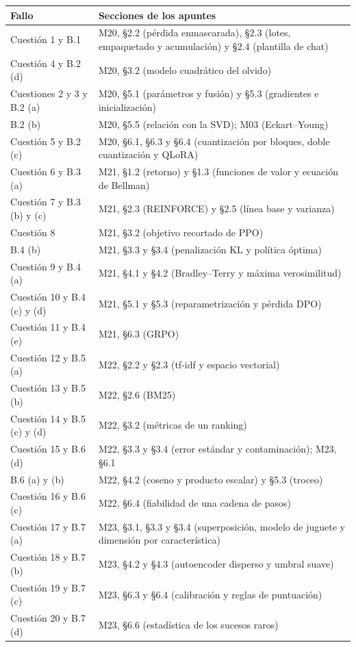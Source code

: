 \begin{center}
\small
\renewcommand{\arraystretch}{1.1}
\begin{tabularx}{\textwidth}{@{}>{\raggedright\arraybackslash}p{3.6cm}X@{}}
\toprule
Fallo & Secciones de los apuntes \\
\midrule
Cuestión 1 y B.1 & M20, §2.2 (pérdida enmascarada), §2.3 (lotes, empaquetado y acumulación) y §2.4 (plantilla de chat) \\
Cuestión 4 y B.2 (d) & M20, §3.2 (modelo cuadrático del olvido) \\
Cuestiones 2 y 3 y B.2 (a) & M20, §5.1 (parámetros y fusión) y §5.3 (gradientes e inicialización) \\
B.2 (b) & M20, §5.5 (relación con la SVD); M03 (Eckart--Young) \\
Cuestión 5 y B.2 (c) & M20, §6.1, §6.3 y §6.4 (cuantización por bloques, doble cuantización y QLoRA) \\
Cuestión 6 y B.3 (a) & M21, §1.2 (retorno) y §1.3 (funciones de valor y ecuación de Bellman) \\
Cuestión 7 y B.3 (b) y (c) & M21, §2.3 (REINFORCE) y §2.5 (línea base y varianza) \\
Cuestión 8 & M21, §3.2 (objetivo recortado de PPO) \\
B.4 (b) & M21, §3.3 y §3.4 (penalización KL y política óptima) \\
Cuestión 9 y B.4 (a) & M21, §4.1 y §4.2 (Bradley--Terry y máxima verosimilitud) \\
Cuestión 10 y B.4 (c) y (d) & M21, §5.1 y §5.3 (reparametrización y pérdida DPO) \\
Cuestión 11 y B.4 (e) & M21, §6.3 (GRPO) \\
Cuestión 12 y B.5 (a) & M22, §2.2 y §2.3 (tf-idf y espacio vectorial) \\
Cuestión 13 y B.5 (b) & M22, §2.6 (BM25) \\
Cuestión 14 y B.5 (c) y (d) & M22, §3.2 (métricas de un ranking) \\
Cuestión 15 y B.6 (d) & M22, §3.3 y §3.4 (error estándar y contaminación); M23, §6.1 \\
B.6 (a) y (b) & M22, §4.2 (coseno y producto escalar) y §5.3 (troceo) \\
Cuestión 16 y B.6 (c) & M22, §6.4 (fiabilidad de una cadena de pasos) \\
Cuestión 17 y B.7 (a) & M23, §3.1, §3.3 y §3.4 (superposición, modelo de juguete y dimensión por característica) \\
Cuestión 18 y B.7 (b) & M23, §4.2 y §4.3 (autoencoder disperso y umbral suave) \\
Cuestión 19 y B.7 (c) & M23, §6.3 y §6.4 (calibración y reglas de puntuación) \\
Cuestión 20 y B.7 (d) & M23, §6.6 (estadística de los sucesos raros) \\
\bottomrule
\end{tabularx}
\end{center}

